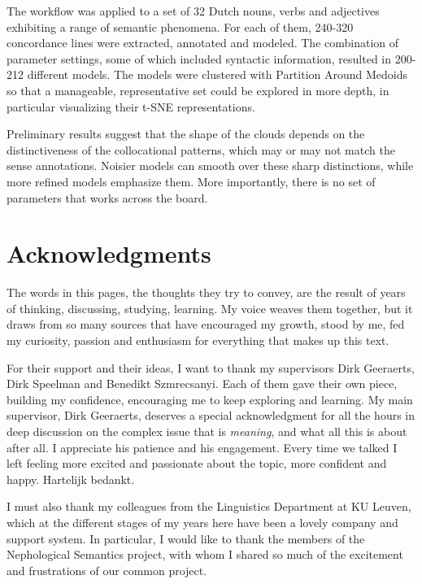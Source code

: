 \documentclass[
]{book}
\begin{document}
The workflow was applied to a set of 32 Dutch nouns, verbs and adjectives exhibiting
a range of semantic phenomena. For each of them, 240-320 concordance lines were extracted,
annotated and modeled. The combination of parameter settings, some of which included syntactic
information, resulted in 200-212 different models. The models were clustered with Partition
Around Medoids \autocite{kaufman.rousseeuw_1990,R-cluster} so that a manageable, representative set could be explored
in more depth, in particular visualizing their t-SNE representations.

Preliminary results suggest that the shape of the clouds depends on the
distinctiveness of the collocational patterns, which may or may not match the sense
annotations. Noisier models can smooth over these sharp distinctions, while more refined
models emphasize them. More importantly, there is no set of parameters that works
across the board.

\hypertarget{acknowledgments}{%
\chapter*{Acknowledgments}\label{acknowledgments}}

The words in this pages, the thoughts they try to convey, are the result of
years of thinking, discussing, studying, learning. My voice weaves them together,
but it draws from so many sources that have encouraged my growth, stood by me,
fed my curiosity, passion and enthusiasm for everything that makes up this text.

For their support and their ideas, I want to thank my supervisors Dirk Geeraerts,
Dirk Speelman and Benedikt Szmrecsanyi. Each of them gave their own piece, building
my confidence, encouraging me to keep exploring and learning. My main supervisor,
Dirk Geeraerts, deserves a special acknowledgment for all the hours in deep
discussion on the complex issue that is \emph{meaning}, and what all this is about after
all. I appreciate his patience and his engagement. Every time we talked I left
feeling more excited and passionate about the topic, more confident and happy.
Hartelijk bedankt.

I must also thank my colleagues from the Linguistics Department at KU Leuven,
which at the different stages of my years here have been a lovely company and
support system. In particular, I would like to thank the members of the
Nephological Semantics project, with whom I shared so much of the excitement and
frustrations of our common project.
\end{document}

